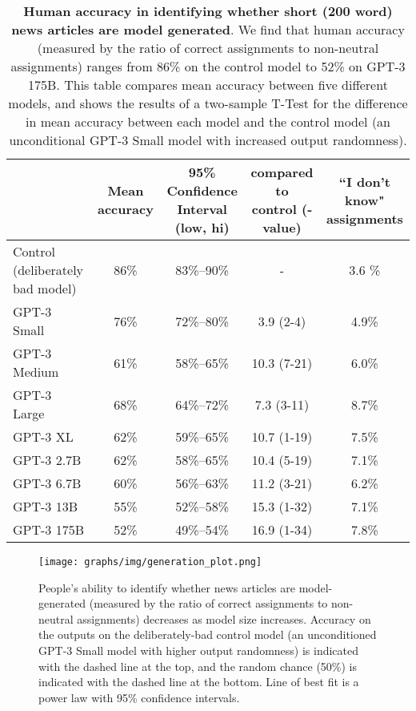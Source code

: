 \documentclass{article}
\begin{document}
\begin{table}
    \centering
        \begin{tabular}{l c c c c}
        \toprule
         & Mean accuracy & \shortstack{95\% Confidence \\Interval (low, hi)} & \shortstack{ compared to \\ control (-value)} & \shortstack{``I don't know" \\ assignments} \\ 
        \midrule
Control (deliberately bad model) & 86\% & 83\%–90\% & - & 3.6 \% \\ 
GPT-3 Small  & 76\% & 72\%–80\% & 3.9 (2-4) & 4.9\% \\ 
GPT-3 Medium & 61\% & 58\%–65\% & 10.3 (7-21) & 6.0\% \\ 
GPT-3 Large  & 68\% & 64\%–72\% & 7.3 (3-11) & 8.7\% \\ 
GPT-3 XL     & 62\% & 59\%–65\% & 10.7 (1-19) & 7.5\% \\ 
GPT-3 2.7B   & 62\% & 58\%–65\% & 10.4 (5-19) & 7.1\% \\ 
GPT-3 6.7B   & 60\% & 56\%–63\% &  11.2 (3-21) & 6.2\% \\ 
GPT-3 13B    & 55\% & 52\%–58\% &  15.3 (1-32) & 7.1\% \\ 
GPT-3 175B   & 52\% & 49\%–54\% & 16.9 (1-34) & 7.8\% \\ 
        \bottomrule
        \end{tabular}
    \caption{\textbf{Human accuracy in identifying whether short (200 word) news articles are model generated}. We find that human accuracy (measured by the ratio of correct assignments to non-neutral assignments) ranges from 86\% on the control model to 52\% on GPT-3 175B. This table compares mean accuracy between five different models, and shows the results of a two-sample T-Test for the difference in mean accuracy between each model and the control model (an unconditional GPT-3 Small model with increased output randomness).}
    \label{table:generation}
\end{table} \begin{figure}
\centering
\texttt{[image: graphs/img/generation\_plot.png]}
\caption{People's ability to identify whether news articles are model-generated (measured by the ratio of correct assignments to non-neutral assignments) decreases as model size increases. Accuracy on the outputs on the deliberately-bad control model (an unconditioned GPT-3 Small model with higher output randomness) is indicated with the dashed line at the top, and the random chance (50\%) is indicated with the dashed line at the bottom. Line of best fit is a power law with 95\% confidence intervals.}
\label{graph:generation}
\end{figure} 
\end{document}
